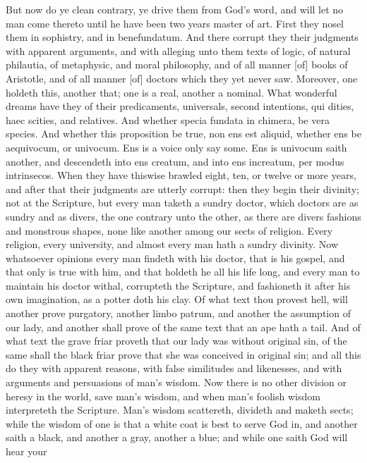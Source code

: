 But now do ye clean contrary, ye drive them 
from God's word, and will let no man come thereto
until he have been two years master of art. 
First they nosel them in sophistry, and in benefundatum.
And there corrupt they their judgments
with apparent arguments, and with alleging
unto them texts of logic, of natural philautia,
of metaphysic, and moral philosophy, and of 
all manner [of] books of Aristotle, and of all manner
[of] doctors which they yet never saw. Moreover,
one holdeth this, another that; one is a real, 
another a nominal. What wonderful dreams have 
they of their predicaments, universals, second intentions,
qui dities, haec scities, and relatives. And 
whether specia fundata in chimera, be vera species.
And whether this proposition be true, non 
ens est aliquid, whether ens be aequivocum, or 
univocum. Ens is a voice only say some. Ens 
is univocum saith another, and descendeth into 
ens creatum, and into ens increatum, per modus 
intrinsecos. When they have thiswise brawled 
eight, ten, or twelve or more years, and after that 
their judgments are utterly corrupt: then they begin
their divinity; not at the Scripture, but every 
man taketh a sundry doctor, which doctors are as 
sundry and as divers, the one contrary unto the 
other, as there are divers fashions and monstrous 
shapes, none like another among our sects of religion.
Every religion, every university, and 
almost every man hath a sundry divinity. Now 
whatsoever opinions every man findeth with 
his doctor, that is his gospel, and that only 
is true with him, and that holdeth he all his 
life long, and every man to maintain his doctor 
withal, corrupteth the Scripture, and fashioneth 
it after his own imagination, as a potter doth his 
clay. Of what text thou provest hell, will 
another prove purgatory, another limbo patrum, 
and another the assumption of our lady, and 
another shall prove of the same text that an ape 
hath a tail. And of what text the grave friar 
proveth that our lady was without original sin, 
of the same shall the black friar prove that she 
was conceived in original sin; and all this do 
they with apparent reasons, with false similitudes 
and likenesses, and with arguments and persuasions
of man's wisdom. Now there is no other 
division or heresy in the world, save man's wisdom,
and when man's foolish wisdom interpreteth 
the Scripture. Man's wisdom scattereth, divideth 
and maketh sects; while the wisdom of one is 
that a white coat is best to serve God in, and 
another saith a black, and another a gray, another 
a blue; and while one saith God will hear your 
